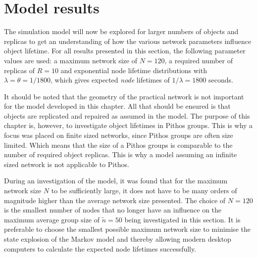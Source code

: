 \section{Model results}
\label{results}

The simulation model will now be explored for larger numbers of objects and replicas to get an understanding of how the various network parameters influence object lifetime. For all results presented in this section, the following parameter values are used: a maximum network size of $N=120$, a required number of replicas of $R = 10$ and exponential node lifetime distributions with $\lambda = \theta = 1/1800$, which gives expected \emph{node} lifetimes of $1/\lambda = 1800$ seconds.

It should be noted that the geometry of the practical network is not important for the model developed in this chapter. All that should be ensured is that objects are replicated and repaired as assumed in the model. The purpose of this chapter is, however, to investigate object lifetimes in Pithos groups. This is why a focus was placed on finite sized networks, since Pithos groups are often size limited. Which means that the size of a Pithos groups is comparable to the number of required object replicas. This is why a model assuming an infinite sized network is not applicable to Pithos.

During an investigation of the model, it was found that for the maximum network size $N$ to be sufficiently large, it does not have to be many orders of magnitude higher than the average network size presented. The choice of $N=120$ is the smallest number of nodes that no longer have an influence on the maximum average group size of $\tilde{n}=50$ being investigated in this section. It is preferable to choose the smallest possible maximum network size to minimise the state explosion of the Markov model and thereby allowing modern desktop computers to calculate the expected node lifetimes successfully.

